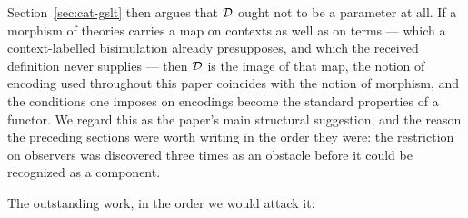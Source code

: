 \documentclass{article}
\begin{document}
Section~\ref{sec:cat-gslt} then argues that $\mathcal{D}$ ought not to be a parameter at all. If a morphism of theories carries a map on contexts as well as on terms --- which a context-labelled bisimulation already presupposes, and which the received definition never supplies --- then $\mathcal{D}$ is the image of that map, the notion of encoding used throughout this paper coincides with the notion of morphism, and the conditions one imposes on encodings become the standard properties of a functor. We regard this as the paper's main structural suggestion, and the reason the preceding sections were worth writing in the order they were: the restriction on observers was discovered three times as an obstacle before it could be recognized as a component.

The outstanding work, in the order we would attack it:
\end{document}
